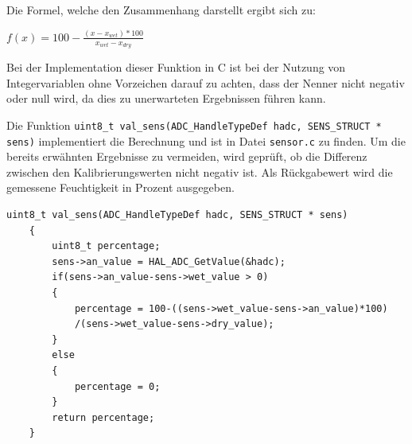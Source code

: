   \smallskip 

  Die Formel, welche den Zusammenhang darstellt ergibt sich zu:
  \smallskip

  \begin{math}
        f(x)=100-\frac{(x-x_{wet})*100}{x_{wet}-x_{dry}}
  \end{math}

  Bei der Implementation dieser Funktion in C ist bei der Nutzung von Integervariablen ohne Vorzeichen darauf zu achten, dass der Nenner nicht negativ oder null wird,
  da dies zu unerwarteten Ergebnissen führen kann.

  \smallskip

  Die Funktion \lstinline!uint8_t val_sens(ADC_HandleTypeDef hadc, SENS_STRUCT * sens)! implementiert die Berechnung und ist in Datei \lstinline!sensor.c! zu finden.
  Um die bereits erwähnten Ergebnisse zu vermeiden, wird geprüft, ob die Differenz zwischen den Kalibrierungswerten nicht negativ ist. Als Rückgabewert wird die 
  gemessene Feuchtigkeit in Prozent ausgegeben.

  \begin{lstlisting}[caption={\textit{Berechnung des Messwerts}}]
    uint8_t val_sens(ADC_HandleTypeDef hadc, SENS_STRUCT * sens)
    {
        uint8_t percentage;
        sens->an_value = HAL_ADC_GetValue(&hadc);
        if(sens->an_value-sens->wet_value > 0)										
        {
            percentage = 100-((sens->wet_value-sens->an_value)*100)
            /(sens->wet_value-sens->dry_value);
        }
        else
        {
            percentage = 0;
        }
        return percentage;
    }
  \end{lstlisting}
